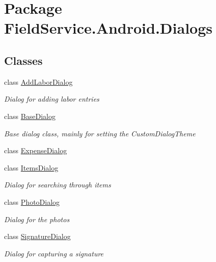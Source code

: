 \hypertarget{namespace_field_service_1_1_android_1_1_dialogs}{\section{Package Field\+Service.\+Android.\+Dialogs}
\label{namespace_field_service_1_1_android_1_1_dialogs}
}
\subsection*{Classes}
\begin{DoxyCompactItemize}
\item 
class \hyperlink{class_field_service_1_1_android_1_1_dialogs_1_1_add_labor_dialog}{Add\+Labor\+Dialog}
\begin{DoxyCompactList}\small\item\em Dialog for adding labor entries \end{DoxyCompactList}\item 
class \hyperlink{class_field_service_1_1_android_1_1_dialogs_1_1_base_dialog}{Base\+Dialog}
\begin{DoxyCompactList}\small\item\em Base dialog class, mainly for setting the Custom\+Dialog\+Theme \end{DoxyCompactList}\item 
class \hyperlink{class_field_service_1_1_android_1_1_dialogs_1_1_expense_dialog}{Expense\+Dialog}
\item 
class \hyperlink{class_field_service_1_1_android_1_1_dialogs_1_1_items_dialog}{Items\+Dialog}
\begin{DoxyCompactList}\small\item\em Dialog for searching through items \end{DoxyCompactList}\item 
class \hyperlink{class_field_service_1_1_android_1_1_dialogs_1_1_photo_dialog}{Photo\+Dialog}
\begin{DoxyCompactList}\small\item\em Dialog for the photos \end{DoxyCompactList}\item 
class \hyperlink{class_field_service_1_1_android_1_1_dialogs_1_1_signature_dialog}{Signature\+Dialog}
\begin{DoxyCompactList}\small\item\em Dialog for capturing a signature \end{DoxyCompactList}\end{DoxyCompactItemize}
